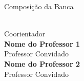 \begin{folhadeaprovacao}

  \begin{center}
    {\ABNTEXchapterfont\large\imprimirautor}

    \vspace*{\fill}\vspace*{\fill}
    \begin{center}
      \ABNTEXchapterfont\bfseries\Large\imprimirtitulo
    \end{center}
    \vspace*{\fill}

    \hspace{.45\textwidth}
    \begin{minipage}{.5\textwidth}
        \imprimirpreambulo
    \end{minipage}%
    \vspace*{\fill}

    Composição da Banca
   \end{center}

   \begin{center}
   {\textbf{\imprimircoorientador} \\ Coorientador\\\vspace*{0.5cm}}
   {\textbf{Nome do Professor 1} \\ Professor Convidado\\\vspace*{0.5cm}}
   {\textbf{Nome do Professor 2} \\ Professor Convidado\\\vspace*{0.5cm}}

\end{center}   
   \begin{center}
    \vspace*{0.5cm}
    {\large\imprimirlocal}
    \par
    {\large\imprimirdata}
    \vspace*{1cm}
  \end{center}

\end{folhadeaprovacao}

